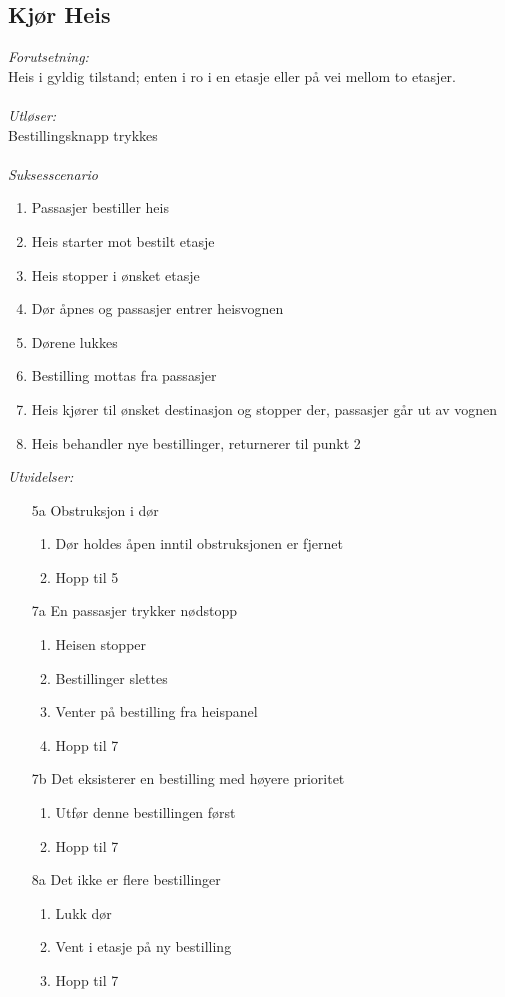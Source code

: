 \documentclass[language=norsk]{ezreport}
\begin{document}
\subsection*{Kjør Heis}
\emph{Forutsetning:}\\
Heis i gyldig tilstand; enten i ro i en etasje eller på vei mellom to etasjer.\\\\
\emph{Utløser:}\\
Bestillingsknapp trykkes\\\\
\emph{Suksesscenario}
\begin{enumerate}
	\item{Passasjer bestiller heis}
	\item{Heis starter mot bestilt etasje}
	\item{Heis stopper i ønsket etasje}
	\item{Dør åpnes og passasjer entrer heisvognen}
	\item{Dørene lukkes}
	\item{Bestilling mottas fra passasjer}
	\item{Heis kjører til ønsket destinasjon og stopper der, passasjer går ut av vognen}
	\item{Heis behandler nye bestillinger, returnerer til punkt 2} 
\end{enumerate}
\emph{Utvidelser:}
\begin{itemize} 
	\item[5a]{Obstruksjon i dør}
		\begin{enumerate}
			\item{Dør holdes åpen inntil obstruksjonen er fjernet}
			\item{Hopp til 5}
		\end{enumerate}
	\item[7a]{En passasjer trykker nødstopp}
		\begin{enumerate}
			\item{Heisen stopper}
			\item{Bestillinger slettes}
			\item{Venter på bestilling fra heispanel}
			\item{Hopp til 7}
		\end{enumerate}
	\item[7b]{Det eksisterer en bestilling med høyere prioritet}
		\begin{enumerate}
			\item {Utfør denne bestillingen først} 
			\item {Hopp til 7}
		\end{enumerate}
	\item[8a]{Det ikke er flere bestillinger}
		\begin{enumerate}
			\item{Lukk dør}
			\item{Vent i etasje på ny bestilling}
			\item{Hopp til 7}
		\end{enumerate}
\end{itemize}
\end{document}

